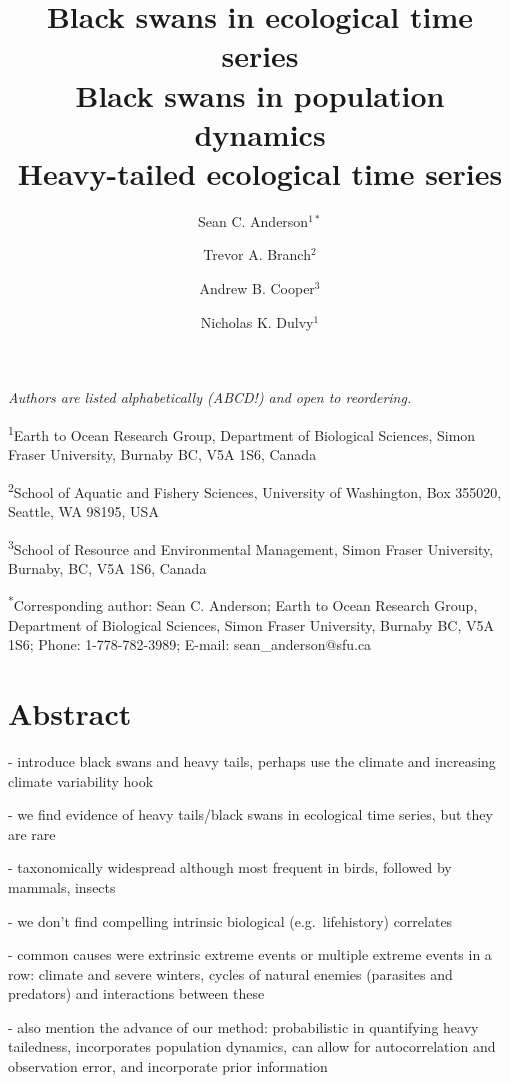 \documentclass[11pt]{article}
\title{Black swans in ecological time series\\Black swans in population dynamics\\Heavy-tailed ecological time series}
\author{
Sean C. Anderson$^{1\ast}$ \and
Trevor A. Branch$^2$ \and
Andrew B. Cooper$^3$ \and
Nicholas K. Dulvy$^1$
}
\date{}
\begin{document}

\onehalfspacing

\maketitle
\thispagestyle{empty}

\noindent
\textit{Authors are listed alphabetically (ABCD!) and open to reordering.}

\noindent
\textsuperscript{1}Earth to Ocean Research Group, Department of Biological Sciences, Simon Fraser University, Burnaby BC, V5A 1S6, Canada

\noindent
\textsuperscript{2}School of Aquatic and Fishery Sciences, University of Washington, Box 355020, Seattle, WA 98195, USA

\noindent
\textsuperscript{3}School of Resource and Environmental Management, Simon Fraser University, Burnaby, BC, V5A 1S6, Canada

\noindent
\textsuperscript{*}Corresponding author: Sean C. Anderson; Earth to Ocean Research Group, Department of Biological Sciences, Simon Fraser University, Burnaby BC, V5A 1S6; Phone: 1-778-782-3989; E-mail: sean\_anderson@sfu.ca

\clearpage

\setcounter{page}{1}

\section{Abstract}
- introduce black swans and heavy tails, perhaps use the climate and increasing climate variability hook

- we find evidence of heavy tails/black swans in ecological time series, but they are rare

- taxonomically widespread although most frequent in birds, followed by mammals, insects

- we don't find compelling intrinsic biological (e.g.\ lifehistory) correlates

- common causes were extrinsic extreme events or multiple extreme events in a row: climate and severe winters, cycles of natural enemies (parasites and predators) and interactions between these

- also mention the advance of our method: probabilistic in quantifying heavy tailedness, incorporates population dynamics, can allow for autocorrelation and observation error, and incorporate prior information
\end{document}
